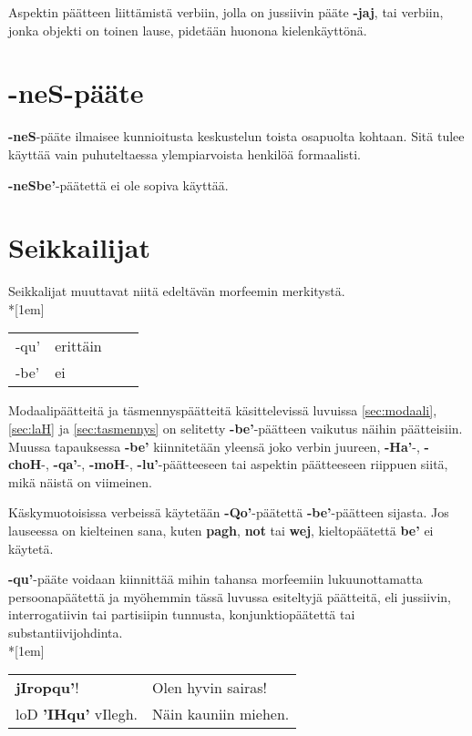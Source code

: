 \documentclass{book}
\begin{document}
Aspektin päätteen liittämistä verbiin, jolla on jussiivin pääte \textbf{-jaj}, tai verbiin, jonka objekti on toinen lause, pidetään huonona kielenkäyttönä.

\section{-neS-pääte}

\textbf{-neS}-pääte ilmaisee kunnioitusta keskustelun toista osapuolta kohtaan.
Sitä tulee käyttää vain puhuteltaessa ylempiarvoista henkilöä formaalisti.

\textbf{-neSbe'}-päätettä ei ole sopiva käyttää.

\section{Seikkailijat}

Seikkalijat muuttavat niitä edeltävän morfeemin merkitystä.
\\*[1em]
\begin{tabular}{Bl Il}
    -qu' & erittäin \\
    -be' & ei \\
\end{tabular}

Modaalipäätteitä ja täsmennyspäätteitä käsittelevissä luvuissa \ref{sec:modaali}, \ref{sec:laH} ja \ref{sec:tasmennys} on selitetty \textbf{-be'}-päätteen vaikutus näihin päätteisiin.
Muussa tapauksessa \textbf{-be'} kiinnitetään yleensä joko verbin juureen, \textbf{-Ha'}-, \textbf{-choH}-, \textbf{-qa'}-, \textbf{-moH}-, \textbf{-lu'}-päätteeseen tai aspektin päätteeseen riippuen siitä, mikä näistä on viimeinen.

Käskymuotoisissa verbeissä käytetään \textbf{-Qo'}-päätettä \textbf{-be'}-päätteen sijasta.
Jos lauseessa on kielteinen sana, kuten \textbf{pagh}, \textbf{not} tai \textbf{wej}, kieltopäätettä \textbf{be'} ei käytetä.

\textbf{-qu'}-pääte voidaan kiinnittää mihin tahansa morfeemiin lukuunottamatta persoonapäätettä ja myöhemmin tässä luvussa esiteltyjä päätteitä, eli jussiivin, interrogatiivin tai partisiipin tunnusta, konjunktiopäätettä tai substantiivijohdinta.\\*[1em]
\begin{tabular}{l l}
    \textbf{jIropqu'}! & Olen hyvin sairas! \\
    loD \textbf{'IHqu'} vIlegh. & Näin kauniin miehen. \\
\end{tabular}
\end{document}
